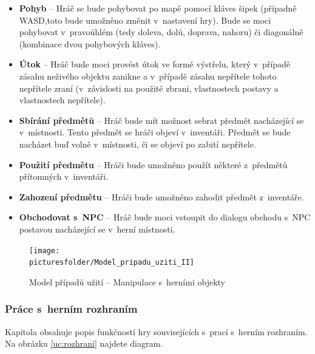 \documentclass[12pt,a4paper]{article}
\def\picturesfolder{obrazky}
\begin{document}
\begin {itemize}
\item{\textbf{Pohyb} --  Hráč se bude pohybovat po mapě pomocí kláves šipek
  (případně WASD,toto bude umožněno změnit v~nastavení hry). Bude se moci
  pohybovat v~pravoúhlém (tedy doleva, dolů, doprava, nahoru) či diagonálně
  (kombinace dvou pohybových kláves).}
\item{\textbf{Útok} --  Hráč bude moci provést útok ve formě výstřelu, který
v~případě zásahu neživého objektu zanikne a v~případě zásahu nepřítele tohoto
  nepřítele zraní (v~závislosti na použité zbrani, vlastnostech postavy a
  vlastnostech nepřítele).}
\item{\textbf{Sbírání předmětů} --  Hráč bude mít možnost sebrat předmět
  nacházející se v~místnosti. Tento předmět se hráči objeví v~inventáři. Předmět
  se bude nacházet buď volně v~místnosti, či se objeví po zabití nepřítele.}
\item{\textbf{Použití předmětu} --  Hráči bude umožněno použít některé
z~předmětů přítomných v~inventáři.}
\item{\textbf{Zahození předmětu} --  Hráči bude umožněno zahodit předmět
z~inventáře.}
\item{\textbf{Obchodovat s~NPC} --  Hráč bude moci vstoupit do dialogu obchodu
  s~NPC postavou nacházející se v~herní místnosti.}
\end {itemize}

\begin{figure}
\begin{center}
  \texttt{[image: \\picturesfolder/Model\_pripadu\_uziti\_II]}
  \caption{Model případů užití -- Manipulace s~herními objekty}
  \label{uc:manipulace}
\end{center}
\end{figure}

\subsubsection{Práce s~herním rozhraním}

Kapitola obsahuje popis funkčností hry souvisejících s~prací s~herním rozhraním.
Na obrázku \ref{uc:rozhrani} najdete diagram.
\end{document}
